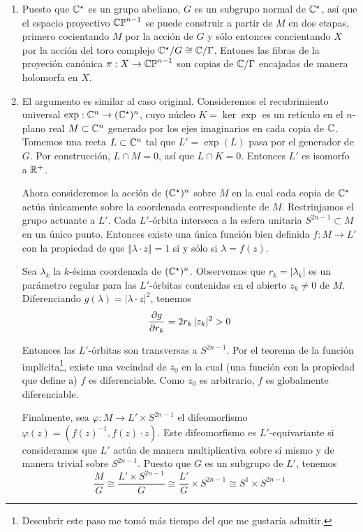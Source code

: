 \begin{solution}
\begin{enumerate}[label=\alph*)]
    \item Puesto que $\mathbb C^\star$ es un grupo abeliano, $G$ es un subgrupo normal de $\mathbb C^\star$, así que el espacio proyectivo $\mathbb {CP}^{n-1}$ se puede construir a partir de $M$ en dos etapas, primero cocientando $M$ por la acción de $G$ y sólo entonces concientando $X$ por la acción del toro complejo $\mathbb C^\star/G \cong \mathbb C/\Gamma$. Entones las fibras de la proyeción canónica $\pi : X \to \mathbb {CP}^{n-1}$ son copias de $\mathbb C/\Gamma$ encajadas de manera holomorfa en $X$.
    
    \item El argumento es similar al caso original. Consideremos el recubrimiento universal $\exp : \mathbb C^n \to (\mathbb C^\star)^n$, cuyo núcleo $K = \ker \exp$ es un retículo en el $n$-plano real $M \subset \mathbb C^n$ generado por los ejes imaginarios en cada copia de $\mathbb C$. Tomemos una recta $L \subset \mathbb C^n$ tal que $L' = \exp(L)$ pasa por el generador de $G$. Por construcción, $L \cap M = 0$, así que $L \cap K = 0$. Entonces $L'$ es isomorfo a $\mathbb R^+$.
    
    Ahora consideremos la acción de $(\mathbb C^\star)^n$ sobre $M$ en la cual cada copia de $\mathbb C^\star$ actúa únicamente sobre la coordenada correspondiente de $M$. Restrinjamos el grupo actuante a $L'$. Cada $L'$-órbita interseca a la esfera unitaria $S^{2n-1} \subset M$ en un único punto. Entonces existe una única función bien definida $f : M \to L'$ con la propiedad de que $\Vert \lambda \cdot z \Vert = 1$ si y sólo si $\lambda = f(z)$.
    
    Sea $\lambda_k$ la $k$-ésima coordenada de $(\mathbb C^\star)^n$. Observemos que $r_k = |\lambda_k|$ es un parámetro regular para las $L'$-órbitas contenidas en el abierto $z_k \ne 0$ de $M$. Diferenciando $g(\lambda) = |\lambda \cdot z|^2$, tenemos
    $$\dfrac {\partial g} {\partial r_k} = 2r_k \, |z_k|^2 > 0$$
    
    Entonces las $L'$-órbitas son transversas a $S^{2n-1}$. Por el teorema de la función implícita\footnote{Descubrir este paso me tomó más tiempo del que me gustaría admitir.}, existe una vecindad de $z_0$ en la cual (una función con la propiedad que define a) $f$ es diferenciable. Como $z_0$ es arbitrario, $f$ es globalmente diferenciable.
    
    Finalmente, sea $\varphi : M \to L' \times S^{2n-1}$ el difeomorfismo $\varphi(z) = (f(z)^{-1}, f(z) \cdot z)$. Este difeomorfismo es $L'$-equivariante si consideramos que $L'$ actúa de manera multiplicativa sobre sí mismo y de manera trivial sobre $S^{2n-1}$. Puesto que $G$ es un subgrupo de $L'$, tenemos
    $$\frac MG \cong \frac {L' \times S^{2n-1}} G \cong \frac {L'} G \times S^{2n-1} \cong S^1 \times S^{2n-1}$$
\end{enumerate}
\end{solution}
